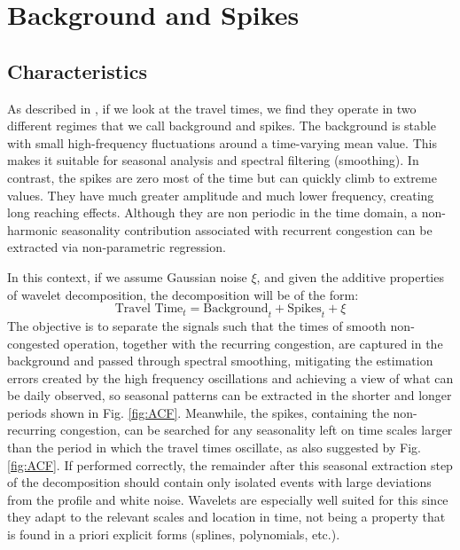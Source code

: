 \documentclass[a4paper, 10pt, conference]{ieeeconf}      %
\begin{document}
\section{Background and Spikes}
\subsection{Characteristics}
As described in \cite{ttprofiles}, if we look at the travel times, we find they operate in two different regimes that we call background and spikes.
The background is stable with small high-frequency fluctuations around a time-varying mean value.
This makes it suitable for seasonal analysis and spectral filtering (smoothing).
In contrast, the spikes are zero most of the time but can quickly climb to extreme values. 
They have much greater amplitude and much lower frequency, creating long reaching effects. 
Although they are non periodic in the time domain, a non-harmonic seasonality contribution associated with recurrent congestion can be extracted via non-parametric regression.

In this context, if we assume Gaussian noise $\xi$, and given the additive properties of wavelet decomposition, the decomposition will be of the form:
\begin{equation}
\textrm{Travel Time}_t  = \textrm{Background}_t + \textrm{Spikes}_t + \xi
\end{equation}
The objective is to separate the signals such that the times of smooth non-congested operation, together with the recurring congestion, are captured in the background and passed through spectral smoothing, mitigating the estimation errors created by the high frequency oscillations and achieving a view of what can be daily observed, so seasonal patterns can be extracted in the shorter and longer periods shown in Fig. \ref{fig:ACF}.
Meanwhile, the spikes, containing the non-recurring congestion, can be searched for any seasonality left on time scales larger than the period in which the travel times oscillate, as also suggested by Fig. \ref{fig:ACF}. 
If performed correctly, the remainder after this seasonal extraction step of the decomposition should contain only isolated events with large deviations from the profile and white noise.
Wavelets are especially well suited for this since they adapt to the relevant scales and location in time, not being a property that is found in a priori explicit forms (splines, polynomials, etc.).
\end{document}
